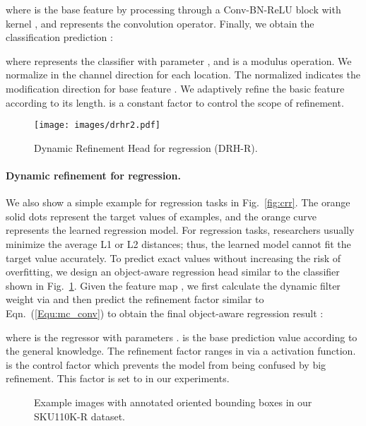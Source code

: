 \documentclass[10pt,twocolumn,letterpaper]{article}
\begin{document}
where  is the base feature by processing  through a Conv-BN-ReLU block with kernel , and  represents the convolution operator. Finally, we obtain the classification prediction :

where  represents the classifier with parameter , and  is a modulus operation. We normalize  in the channel direction for each location. The normalized  indicates the modification direction for base feature . We adaptively refine the basic feature according to its length.  is a constant factor to control the scope of refinement.

\begin{figure}\centering
\texttt{[image: images/drhr2.pdf]}
\caption{Dynamic Refinement Head for regression (DRH-R).}
\label{fig:dfmr}
\end{figure}
 \paragraph{Dynamic refinement for regression.}
We also show a simple example for regression tasks in Fig.~\ref{fig:crr}. The orange solid dots represent the target values of examples, and the orange curve represents the learned regression model. For regression tasks, researchers usually minimize the average L1 or L2 distances; thus, the learned model cannot fit the target value accurately. To predict exact values without increasing the risk of overfitting, we design an object-aware regression head similar to the classifier shown in Fig.~\ref{fig:dfmr}.
Given the feature map   , we first calculate the dynamic filter weight  via  and then predict the refinement factor  similar to Eqn.~(\ref{Equ:mc_conv}) to obtain the final object-aware regression result :

where  is the regressor with parameters .  is the base prediction value according to the general knowledge. The refinement factor ranges in  via a  activation function.
 is the control factor which prevents the model from being confused by big refinement. This factor is set to  in our experiments.

\begin{figure}\centering
{}
\caption{Example images with annotated oriented bounding boxes in our SKU110K-R dataset.}
\label{fig:rsku110k}
\end{figure}
\end{document}
